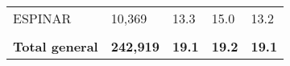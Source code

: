 \begin{tabular}{lllll}
	\cellcolor[HTML]{FF5050}ESPINAR                                & 10,369                                                                & 13.3                                                                             & 15.0                                                                        & 13.2                                                                                \\
	&                                                                       &                                                                                  &                                                                             &                                                                                     \\
	\rowcolor[HTML]{DDEBF7} 
	\textbf{Total   general}                                       & \textbf{242,919}                                                      & \textbf{19.1}                                                                    & \textbf{19.2}                                                               & \textbf{19.1}                                                                      
\end{tabular}